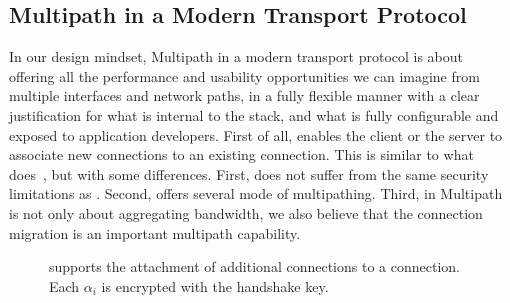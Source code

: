 

\subsection{Multipath in a Modern Transport Protocol}
\label{sec:multipath}

In our design mindset, Multipath in a modern transport protocol is about
offering all the performance and usability opportunities we can imagine from
multiple interfaces and network paths, in a fully flexible manner with a clear
justification for what is internal to the stack, and what is fully configurable
and exposed to application developers.
First of all, \tcpls enables the client or the server to associate new \tcp connections to an
existing \tcpls connection. This is similar to what \mptcp
does~\cite{raiciu2012hard,rfc6824}, but with some differences. First, \tcpls
does not suffer from the same security limitations as \mptcp.
Second, \tcpls offers several mode of multipathing.
Third, in \tcpls Multipath is not only about aggregating bandwidth, we also
believe that the connection migration is an important multipath capability.


\begin{figure}[!t]
  \centering
  \caption{\tcpls supports the attachment of additional \tcp
    connections to a \tcpls connection. Each $\alpha_i$ is encrypted with the
    handshake key.}
  \label{fig:join-example}
\end{figure}

